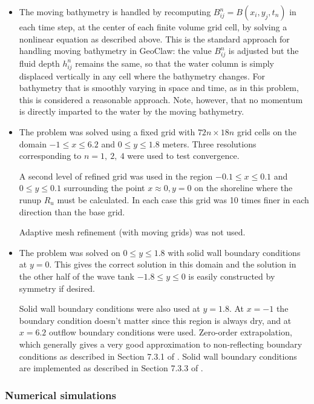 \begin{itemize}
\item  The moving bathymetry is handled by recomputing $B_{ij}^n =
B(x_i,y_j,t_n)$ in
each time step, at the center of each finite volume grid cell, by solving a
nonlinear equation as described above.  This is the standard approach
for handling moving bathymetry in GeoClaw:  the value $B_{ij}^n$ is adjusted
but the fluid depth $h_{ij}^n$ remains the same, so that the water column is
simply displaced vertically in any cell where the bathymetry changes.  For
bathymetry that is smoothly varying  in space and time, as in this problem,
this is considered a reasonable approach.  Note, however, that no momentum
is directly imparted to the water by the moving bathymetry.  

\item The problem was solved using a fixed grid with $72n \times 18n$ grid
cells on the domain $-1\leq x \leq 6.2$ and $0\leq y \leq 1.8$ meters.
Three resolutions corresponding to $n=1,~2,~4$ were used to test
convergence.

A second level of refined grid was used in the region $-0.1\leq x \leq 0.1$
and $0\leq y \leq 0.1$ surrounding the point $x\approx 0, y=0$
on the shoreline where the runup $R_u$ must be calculated.  In each case
this grid was 10 times finer in each direction than the base grid.  

Adaptive mesh refinement (with moving grids) was not used.

\item The problem was solved on $0\leq y \leq 1.8$ with solid wall boundary
conditions at $y=0$.  This gives the correct solution in this
domain and the solution in the other half of the wave tank $-1.8\leq y\leq
0$  is easily constructed by symmetry if desired.

Solid wall boundary conditions were also used at $y=1.8$.  At $x=-1$ the
boundary condition doesn't matter since this region is always dry, and at
$x=6.2$ outflow boundary conditions were used.  Zero-order extrapolation,
which generally gives a very good approximation to non-reflecting boundary
conditions as described in Section 7.3.1 of \cite{rjl:fvmhp}.  Solid wall
boundary conditions are implemented as described in Section 7.3.3 of
\cite{rjl:fvmhp}.


\end{itemize} 


\subsubsection{Numerical simulations}

